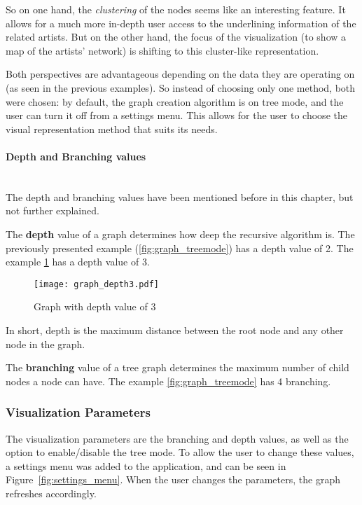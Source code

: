       So on one hand, the \emph{clustering} of the nodes seems like an interesting feature.
      It allows for a much more in-depth user access to the underlining information of the related artists.
      But on the other hand, the focus of the visualization (to show a map of the artists' network) is shifting to this cluster-like representation.

      Both perspectives are advantageous depending on the data they are operating on (as seen in the previous examples).
      So instead of choosing only one method, both were chosen: by default, the graph creation algorithm is on tree mode, and the user can turn it off from a settings menu.
      This allows for the user to choose the visual representation method that suits its needs.

      \paragraph{Depth and Branching values} \hfill \\
      The depth and branching values have been mentioned before in this chapter, but not further explained.

      The \textbf{depth} value of a graph determines how deep the recursive algorithm is.
      The previously presented example (\ref{fig:graph_treemode}) has a depth value of 2.
      The example \ref{fig:graph_depth3} has a depth value of 3.
      \begin{figure}[hb]
        \begin{center}
          \texttt{[image: graph\_depth3.pdf]}
        \end{center}
        \caption{Graph with depth value of 3}
        \label{fig:graph_depth3}
      \end{figure}
      In short, depth is the maximum distance between the root node and any other node in the graph.

      The \textbf{branching} value of a tree graph determines the maximum number of child nodes a node can have.
      The example \ref{fig:graph_treemode} has 4 branching.


    \subsubsection{Visualization Parameters} %
    \label{ssub:visualization_parameters}
    
    The visualization parameters are the branching and depth values, as well as the option to enable/disable the tree mode.
    To allow the user to change these values, a settings menu was added to the application, and can be seen in Figure~\ref{fig:settings_menu}.
    When the user changes the parameters, the graph refreshes accordingly.

